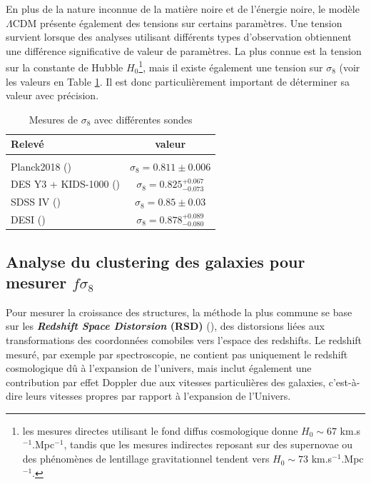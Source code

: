 \documentclass{book}
\begin{document}
En plus de la nature inconnue de la matière noire et de l'énergie noire, le modèle $\Lambda$CDM présente également des tensions sur certains paramètres. Une tension survient lorsque des analyses utilisant différents types d'observation obtiennent une différence significative de valeur de paramètres. La plus connue est la tension sur la constante de Hubble $H_0$\footnote{les mesures directes utilisant le fond diffus cosmologique donne $H_0 \sim 67$ km.s$^{-1}$.Mpc$^{-1}$, tandis que les mesures indirectes reposant sur des supernovae ou des phénomènes de lentillage gravitationnel tendent vers $H_0 \sim 73$ km.s$^{-1}$.Mpc$^{-1}$.}, mais il existe également une tension sur $\sigma_8$ (voir les valeurs en Table \ref{tab:fs8}. Il est donc particulièrement important de déterminer sa valeur avec précision.

\begin{table}
	\begin{tabular}{l|c}
		Relevé & valeur\\
		\hline\\
		Planck2018 (\cite{planck_collaboration_planck_2020}) & $\sigma_8 = 0.811\pm 0.006$\\
		DES Y3 + KIDS-1000 (\cite{dark_energy_survey_y3_2023}) & $\sigma_8 = 0.825^{+0.067}_{-0.073}$\\
		SDSS IV  (\cite{eboss_collaboration_completed_2021}) & $\sigma_8 = 0.85 \pm 0.03$\\
		DESI (\cite{chen_not_2024}) & $\sigma_8 = 0.878^{+0.089}_{-0.080}$
	\end{tabular}
	\caption{Mesures de $\sigma_8$ avec différentes sondes}
	\label{tab:fs8}
\end{table}

\subsection{Analyse du clustering des galaxies pour mesurer $f\sigma_8$}

Pour mesurer la croissance des structures, la méthode la plus commune se base sur les \textbf{\textit{Redshift Space Distorsion} (RSD)} (\cite{kaiser_clustering_1987}), des distorsions liées aux transformations des coordonnées comobiles vers l'espace des redshifts. Le redshift mesuré, par exemple par spectroscopie, ne contient pas uniquement le redshift cosmologique dû à l'expansion de l'univers, mais inclut également une contribution par effet Doppler due aux vitesses particulières des galaxies, c'est-à-dire leurs vitesses propres par rapport à l'expansion de l'Univers.
\end{document}
